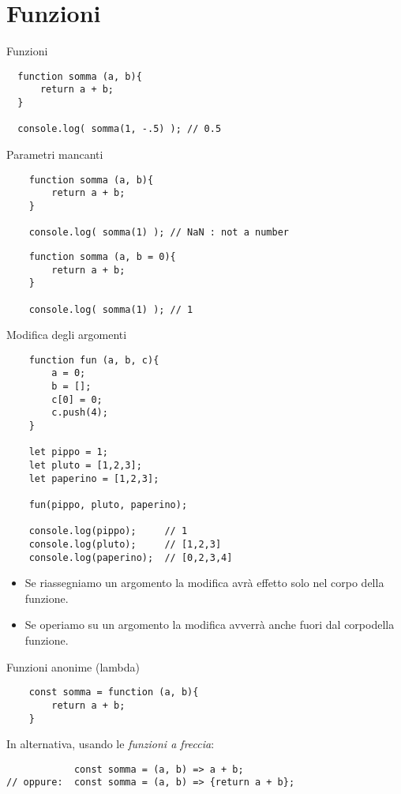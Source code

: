\section{Funzioni}
\begin{frame}[fragile]{Funzioni}\transfade\centering
\begin{verbatim}
  function somma (a, b){
      return a + b;
  }

  console.log( somma(1, -.5) ); // 0.5
\end{verbatim}
\end{frame}

\begin{frame}[fragile]{Parametri mancanti}\transfade\centering
  \begin{verbatim}
    function somma (a, b){
        return a + b;
    }

    console.log( somma(1) ); // NaN : not a number
  \end{verbatim}
  \pause\bigskip
  \begin{verbatim}
    function somma (a, b = 0){
        return a + b;
    }

    console.log( somma(1) ); // 1
  \end{verbatim}
\end{frame}

\begin{frame}[fragile]{Modifica degli argomenti}\transfade\centering
  \begin{verbatim}
    function fun (a, b, c){
        a = 0;
        b = [];
        c[0] = 0;
        c.push(4);
    }

    let pippo = 1;
    let pluto = [1,2,3];
    let paperino = [1,2,3];

    fun(pippo, pluto, paperino);

    console.log(pippo);     // 1
    console.log(pluto);     // [1,2,3]
    console.log(paperino);  // [0,2,3,4]
  \end{verbatim}
  \bigskip
  \begin{itemize}
    \item Se riassegniamo un argomento la modifica avrà effetto solo nel corpo della funzione.
    \item Se operiamo su un argomento la modifica avverrà anche fuori dal corpodella funzione.
  \end{itemize}
\end{frame}

\begin{frame}[fragile]{Funzioni anonime (lambda)}\transfade\centering
  \begin{verbatim}
    const somma = function (a, b){
        return a + b;
    }
  \end{verbatim}
  \pause\bigskip
  In alternativa, usando le \emph{funzioni a freccia}:
  \begin{verbatim}
            const somma = (a, b) => a + b;
// oppure:  const somma = (a, b) => {return a + b};
\end{verbatim}
\end{frame}